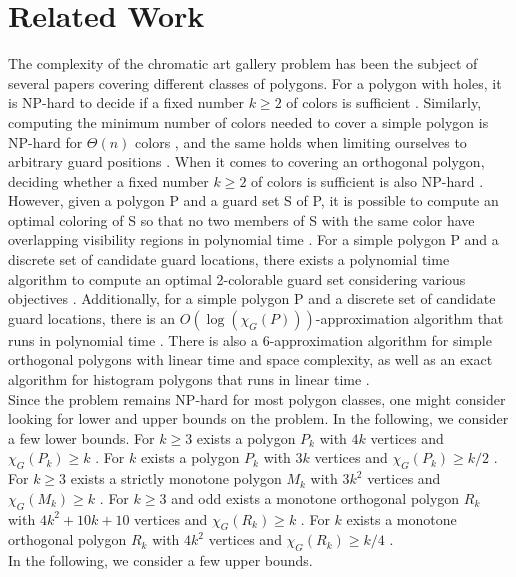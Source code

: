 \section{Related Work}
The complexity of the chromatic art gallery problem has been the subject of several papers covering different classes of polygons.
For a polygon with holes, it is NP-hard to decide if a fixed number $k \geq 2$ of colors is sufficient \cite{fekete2014complexity}. Similarly, computing the minimum number of colors needed to cover a simple polygon is NP-hard for $\Theta(n)$ colors \cite{fekete2014complexity}, and the same holds when limiting ourselves to arbitrary guard positions \cite{fekete2014chromatic}. When it comes to covering an orthogonal polygon, deciding whether a fixed number $k \geq 2$ of colors is sufficient is also NP-hard \cite{hoorfar2021np}. However, given a polygon P and a guard set S of P, it is possible to compute an optimal coloring of S so that no two members of S with the same color have overlapping visibility regions in polynomial time \cite{erickson2011many}. For a simple polygon P and a discrete set of candidate guard locations, there exists a polynomial time algorithm to compute an optimal 2-colorable guard set considering various objectives \cite{fekete2014chromatic}. Additionally, for a simple polygon P and a discrete set of candidate guard locations, there is an $O(\log (\chi_G(P)))$-approximation algorithm that runs in polynomial time \cite{fekete2014chromatic}. There is also a 6-approximation algorithm for simple orthogonal polygons with linear time and space complexity, as well as an exact algorithm for histogram polygons that runs in linear time \cite{hoorfar2021np}.\\
Since the problem remains NP-hard for most polygon classes, one might consider looking for lower and upper bounds on the problem.
In the following, we consider a few lower bounds.
For $k \geq 3$ exists a polygon $P_k$ with $4k$ vertices and $\chi_G(P_k) \geq k$ \cite{erickson2012art}.
For $k$ exists a polygon $P_k$ with $3k$ vertices and $\chi_G(P_k) \geq k/2$ \cite{bartschi2011coloring}.
For $k \geq 3$ exists a strictly monotone polygon $M_k$ with $3k^2$ vertices and $\chi_G(M_k) \geq k$ \cite{erickson2012art}.
For $k \geq 3$ and odd exists a monotone orthogonal polygon $R_k$ with $4k^2 + 10k + 10$ vertices and $\chi_G(R_k) \geq k$ \cite{erickson2012art}.
For $k$ exists a monotone orthogonal polygon $R_k$ with $4k^2$ vertices and $\chi_G(R_k) \geq k/4$ \cite{bartschi2011coloring}.\\
In the following, we consider a few upper bounds.
